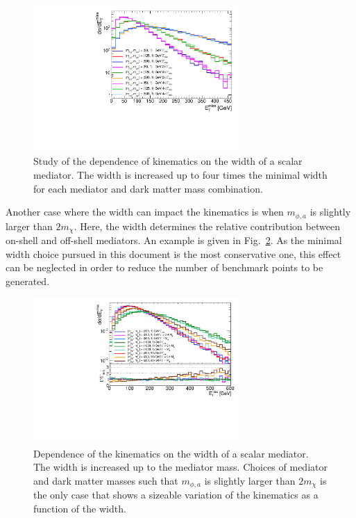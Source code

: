 \begin{figure}[!ht]
  \begin{center}
    \includegraphics[width=0.7\textwidth]{figures/ttbar/MEt_smallwidth.pdf}
    \caption{\label{fig:widthsmallscan} Study of the dependence of kinematics on the width of a scalar mediator. The width is increased up to four times the minimal width for each mediator and dark matter mass combination. 
    }
\end{center}
\end{figure}

Another case where the width can impact the kinematics is when $m_{\phi,a}$ is slightly larger than $2m_\chi$. Here, the width determines the relative contribution between on-shell and off-shell mediators. An example is given in Fig.~\ref{fig:widthlargescan}. As the minimal width choice pursued in this document is the most conservative one, this effect can be neglected in order to reduce the number of benchmark points to be generated. 


\begin{figure}[!ht]
  \begin{center}
    \includegraphics[width=0.7\textwidth]{figures/ttbar/ScalarWidth.pdf}
    \vspace{2mm}
    \caption{\label{fig:widthlargescan} Dependence of the kinematics on the width of a scalar mediator. The width is increased up to the mediator mass. Choices of mediator and dark matter masses such that $m_{\phi,a}$ is slightly larger than $2m_\chi$ is the only case that shows a sizeable variation of the kinematics as a function of the width.  
    }
\end{center}
\end{figure}

